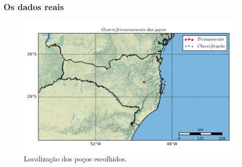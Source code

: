 \documentclass[aspectratio=10]{beamer} %
\begin{document}
\begin{frame}
	\frametitle{Os dados reais}
\begin{figure}[H]
\centering
		\includegraphics[scale=0.5]{Imagens/locmap02.pdf}
	\caption{Localização dos poços escolhidos.}
	\label{loc02}
\end{figure}
\end{frame}
\end{document}
